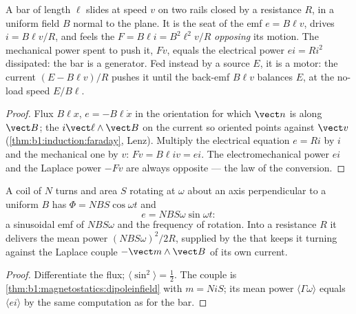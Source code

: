\begin{proposition}\label{prop:b1:induction:rails}
A bar of length $\ell$ slides at speed $v$ on two rails closed by a
resistance $R$, in a uniform field $B$ normal to the plane. It is the
seat of the emf $e = B\ell v$, drives $i = B\ell v/R$, and feels the
 $F = B\ell i = B^2\ell^2v/R$ \emph{opposing} its motion.
The mechanical power spent to push it, $Fv$, equals the electrical
power $ei = Ri^2$ dissipated: the bar is a generator. Fed instead by a
source $E$, it is a motor: the current $(E - B\ell v)/R$ pushes it
until the back-emf $B\ell v$ balances $E$, at the no-load speed $E/B\ell$.
\end{proposition}

\begin{proof}
Flux $B\ell x$, $e = -B\ell\dot x$ in the orientation for which $\vect n$ is
along $\vect B$; the  $i\vect\ell\wedge\vect B$ on the current
so oriented points against $\vect v$ (\cref{thm:b1:induction:faraday},
Lenz). Multiply the electrical equation $e = Ri$ by $i$ and the
mechanical one by $v$: $Fv = B\ell iv = ei$. The electromechanical
power $ei$ and the Laplace power $-Fv$ are always opposite --- the law
of the conversion.
\end{proof}

\begin{proposition}\label{prop:b1:induction:alternator}
A coil of $N$ turns and area $S$ rotating at $\omega$ about an axis
perpendicular to a uniform $B$ has $\Phi = NBS\cos\omega t$ and
\[
e = NBS\omega\sin\omega t :
\]
a sinusoidal emf of  $NBS\omega$ and the frequency of rotation.
Into a resistance $R$ it delivers the mean power $(NBS\omega)^2/2R$,
supplied by the  that keeps it turning against the Laplace
couple $-\vect m\wedge\vect B$ of its own current.
\end{proposition}

\begin{proof}
Differentiate the flux; $\langle\sin^2\rangle = \tfrac12$. The couple is
\cref{thm:b1:magnetostatics:dipoleinfield} with $m = Ni S$; its mean
power $\langle\Gamma\omega\rangle$ equals $\langle ei\rangle$ by the same
computation as for the bar.
\end{proof}

